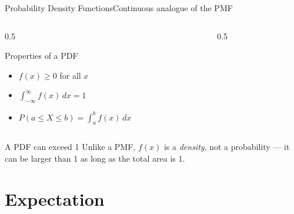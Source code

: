 \documentclass[aspectratio=169,11pt]{beamer}
\begin{document}
\begin{frame}{Probability Density Functions}{Continuous analogue of the PMF}
  \begin{columns}[T]
    \begin{column}{0.5\textwidth}
      \begin{block}{Properties of a PDF}
        \small
        \begin{itemize}
          \item $f(x) \ge 0$ for all $x$
          \item $\displaystyle\int_{-\infty}^{\infty} f(x)\,dx = 1$
          \item $P(a\le X\le b) = \displaystyle\int_a^b f(x)\,dx$
        \end{itemize}
      \end{block}
    \end{column}
    \begin{column}{0.5\textwidth}
      \centering
    \end{column}
  \end{columns}
  \begin{alertblock}{A PDF can exceed 1}
    \small Unlike a PMF, $f(x)$ is a \emph{density}, not a probability — it
    can be larger than 1 as long as the total area is 1.
  \end{alertblock}
\end{frame}

\section{Expectation}
\end{document}
